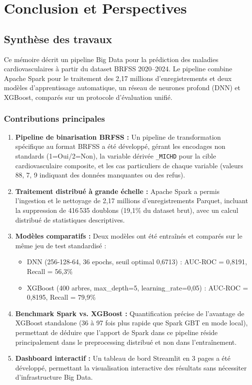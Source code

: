 \chapter{Conclusion et Perspectives}

\section{Synthèse des travaux}

Ce mémoire décrit un pipeline Big Data pour la prédiction des maladies cardiovasculaires
à partir du dataset BRFSS 2020--2024.
Le pipeline combine Apache Spark pour le traitement des 2,17 millions d'enregistrements
et deux modèles d'apprentissage automatique, un réseau de neurones profond (DNN)
et XGBoost, comparés sur un protocole d'évaluation unifié.

\subsection{Contributions principales}

\begin{enumerate}
    \item \textbf{Pipeline de binarisation BRFSS :} Un pipeline de transformation spécifique au format BRFSS a été développé, gérant les encodages non standards (1=Oui/2=Non), la variable dérivée \texttt{\_MICHD} pour la cible cardiovasculaire composite, et les cas particuliers de chaque variable (valeurs 88, 7, 9 indiquant des données manquantes ou des refus).

    \item \textbf{Traitement distribué à grande échelle :} Apache Spark a permis l'ingestion et le nettoyage de 2,17 millions d'enregistrements Parquet, incluant la suppression de 416\,535 doublons (19,1\% du dataset brut), avec un calcul distribué de statistiques descriptives.

    \item \textbf{Modèles comparatifs :} Deux modèles ont été entraînés et comparés sur le même jeu de test standardisé :
    \begin{itemize}
        \item DNN (256-128-64, 36 epochs, seuil optimal 0,6713) : AUC-ROC = 0,8191, Recall = 56,3\%
        \item XGBoost (400 arbres, max\_depth=5, learning\_rate=0,05) : AUC-ROC = 0,8195, Recall = 79,9\%
    \end{itemize}

    \item \textbf{Benchmark Spark vs. XGBoost :} Quantification précise de l'avantage de XGBoost standalone (36 à 97 fois plus rapide que Spark GBT en mode local), permettant de déduire que l'apport de Spark dans ce pipeline réside principalement dans le preprocessing distribué et non dans l'entraînement.

    \item \textbf{Dashboard interactif :} Un tableau de bord Streamlit en 3 pages a été développé, permettant la visualisation interactive des résultats sans nécessiter d'infrastructure Big Data.
\end{enumerate}

